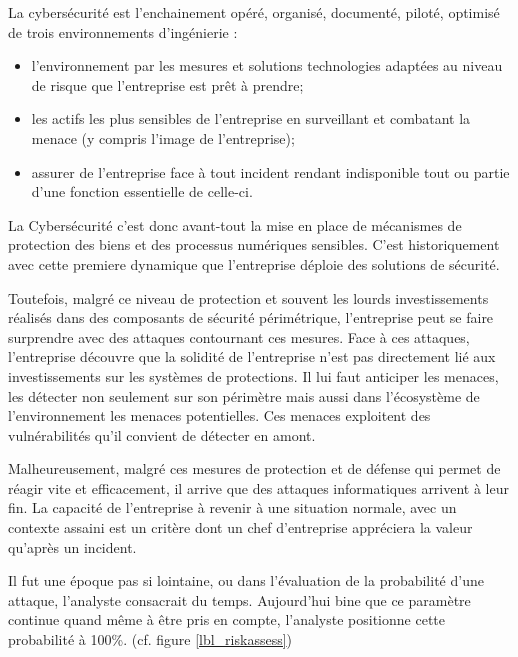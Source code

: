 \begin{frame}

La cybersécurité est l'enchainement opéré, organisé, documenté, piloté, optimisé de trois environnements d'ingénierie :
\begin{itemize}
 \item {} l'environnement par les mesures et solutions technologies adaptées au niveau de risque que l'entreprise est prêt à prendre; 
 \item {} les actifs les plus sensibles de l'entreprise en surveillant et combatant la menace (y compris l'image de l'entreprise);
 \item assurer  de l'entreprise face à tout incident rendant indisponible tout ou partie d'une fonction essentielle de celle-ci.
\end{itemize}

\end{frame}

La Cybersécurité c’est donc avant-tout la mise en place de mécanismes de protection des biens et des processus numériques sensibles. C’est historiquement avec cette premiere dynamique que l’entreprise déploie des solutions de sécurité. 

Toutefois, malgré ce niveau de protection et souvent les lourds investissements réalisés dans des composants de sécurité périmétrique, l’entreprise peut se faire surprendre avec des attaques contournant ces mesures. Face à ces attaques, l’entreprise découvre que la solidité de l’entreprise n’est pas directement lié aux investissements sur les systèmes de protections. Il lui faut anticiper les menaces, les détecter non seulement sur son périmètre mais aussi dans l’écosystème de l’environnement les menaces potentielles. Ces menaces exploitent des vulnérabilités qu’il convient de détecter en amont.

Malheureusement, malgré ces mesures de protection et de défense qui permet de réagir vite et efficacement, il arrive que des attaques informatiques arrivent à leur fin. La capacité de l’entreprise à revenir à une situation normale, avec un contexte assaini est un critère dont un chef d’entreprise appréciera la valeur qu’après un incident.


Il fut une époque pas si lointaine, ou dans l'évaluation de la probabilité d'une attaque, l'analyste consacrait du temps. Aujourd'hui bine que ce paramètre continue quand même à être pris en compte, l'analyste positionne cette probabilité à 100\%.  (cf. figure \ref{lbl_riskassess})

